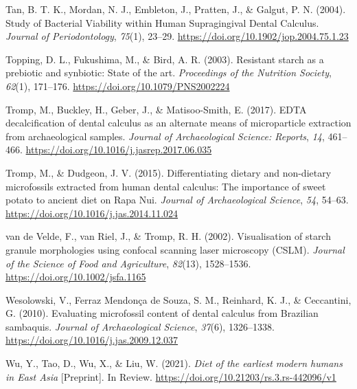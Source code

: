 \documentclass[
  letterpaper,
]{book}
\newlength{\cslhangindent}
\newlength{\cslentryspacingunit} %
\newenvironment{CSLReferences}[2] %
 {%
  \setlength{\parindent}{0pt}
  \ifodd #1
  \let\oldpar\par
  \def\par{\hangindent=\cslhangindent\oldpar}
  \fi
  \setlength{\parskip}{#2\cslentryspacingunit}
 }%
 {}
\begin{document}
\begin{CSLReferences}{1}{0}
\leavevmode{}%
Tan, B. T. K., Mordan, N. J., Embleton, J., Pratten, J., \& Galgut, P.
N. (2004). Study of {Bacterial Viability} within {Human Supragingival
Dental Calculus}. \emph{Journal of Periodontology}, \emph{75}(1),
23--29. \url{https://doi.org/10.1902/jop.2004.75.1.23}

\leavevmode{}%
Topping, D. L., Fukushima, M., \& Bird, A. R. (2003). Resistant starch
as a prebiotic and synbiotic: State of the art. \emph{Proceedings of the
Nutrition Society}, \emph{62}(1), 171--176.
\url{https://doi.org/10.1079/PNS2002224}

\leavevmode{}%
Tromp, M., Buckley, H., Geber, J., \& Matisoo-Smith, E. (2017). {EDTA}
decalcification of dental calculus as an alternate means of
microparticle extraction from archaeological samples. \emph{Journal of
Archaeological Science: Reports}, \emph{14}, 461--466.
\url{https://doi.org/10.1016/j.jasrep.2017.06.035}

\leavevmode{}%
Tromp, M., \& Dudgeon, J. V. (2015). Differentiating dietary and
non-dietary microfossils extracted from human dental calculus: The
importance of sweet potato to ancient diet on {Rapa Nui}. \emph{Journal
of Archaeological Science}, \emph{54}, 54--63.
\url{https://doi.org/10.1016/j.jas.2014.11.024}

\leavevmode{}%
van de Velde, F., van Riel, J., \& Tromp, R. H. (2002). Visualisation of
starch granule morphologies using confocal scanning laser microscopy
({CSLM}). \emph{Journal of the Science of Food and Agriculture},
\emph{82}(13), 1528--1536. \url{https://doi.org/10.1002/jsfa.1165}

\leavevmode{}%
Wesolowski, V., Ferraz Mendonça de Souza, S. M., Reinhard, K. J., \&
Ceccantini, G. (2010). Evaluating microfossil content of dental calculus
from {Brazilian} sambaquis. \emph{Journal of Archaeological Science},
\emph{37}(6), 1326--1338.
\url{https://doi.org/10.1016/j.jas.2009.12.037}

\leavevmode{}%
Wu, Y., Tao, D., Wu, X., \& Liu, W. (2021). \emph{Diet of the earliest
modern humans in {East Asia}} {[}Preprint{]}. {In Review}.
\url{https://doi.org/10.21203/rs.3.rs-442096/v1}

\end{CSLReferences}
\end{document}
